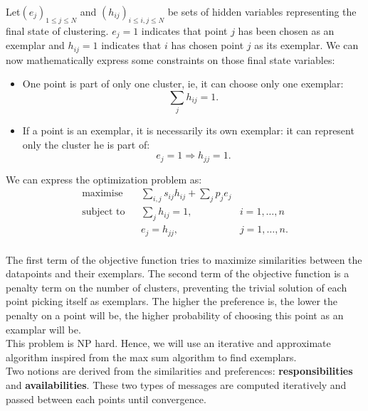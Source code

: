 \documentclass{ipol}
\begin{document}
Let$(e_j)_{1 \leq j \leq N}$ and $(h_{ij})_{i \leq i, j \leq N}$ be sets of
hidden variables representing the final state of clustering. $e_j = 1$
indicates that point $j$ has been chosen as an exemplar and $h_{ij} = 1$
indicates that $i$ has chosen point $j$ as its exemplar. We can now
mathematically express some constraints on those final state variables:

\begin{itemize}
\item One point is part of only one cluster, ie, it can choose only one
exemplar:
\begin{equation*}
\sum_{j} h_{ij} = 1.
\end{equation*}
\item If a point is an exemplar, it is necessarily its own exemplar: it can
represent only the cluster he is part of:
\begin{equation*}
e_{j} = 1 \Rightarrow h_{jj} = 1.
\end{equation*}
\end{itemize}

We can express the optimization problem as:
\begin{equation*}
\renewcommand{\arraystretch}{2}
\begin{array}{ccll}
\text{maximise} & & \sum_{i, j} s_{ij} h_{ij} + \sum_{j} p_j e_j & \\
\text{subject to} &  & \sum_{j} h_{ij} = 1, & i = 1, \dots, n \\
		  &  & e_{j} = h_{jj}, & j = 1, \dots, n.\\
\end{array}
\end{equation*}


The first term of the objective function tries to maximize similarities
between the datapoints and their exemplars. The second term of the objective
function is a penalty term on the number of clusters, preventing the trivial
solution of each point picking itself as exemplars. The higher the preference
is, the lower the penalty on a point will be, the higher probability of
choosing this point as an examplar will be. \\

This problem is NP hard. Hence, we will use an iterative and approximate
algorithm inspired from the max sum algorithm to find exemplars. \\

Two notions are derived from the similarities and preferences:
\textbf{responsibilities} and \textbf{availabilities}. These two types of
messages are computed iteratively and passed between each points until
convergence. \\
\end{document}
